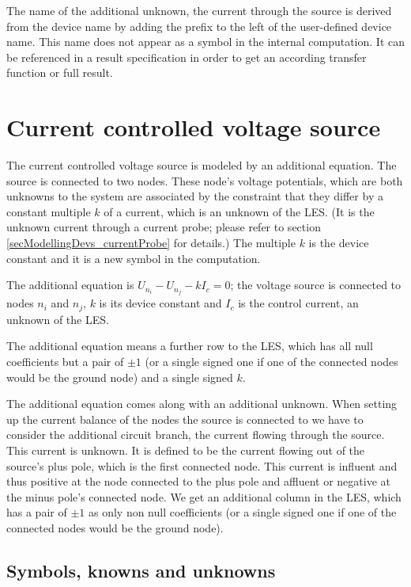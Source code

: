 The name of the additional unknown, the current through the source is
derived from the device name by adding the prefix  to the left
of the user-defined device name. This name does not appear as a symbol in
the internal computation. It can be referenced in a result specification
in order to get an according transfer function or full result.


\section{Current controlled voltage source}

The current controlled voltage source is modeled by an additional
equation. The source is connected to two nodes. These node's voltage
potentials, which are both unknowns to the system are associated by the
constraint that they differ by a constant multiple $k$ of a current, which
is an unknown of the LES. (It is the unknown current through a current
probe; please refer to section \ref{secModellingDevs_currentProbe} for
details.) The multiple $k$ is the device constant and it is a new symbol
in the computation.

The additional equation is $U_{n_i} - U_{n_j} - k I_c = 0$;
the voltage source is connected to nodes $n_i$ and $n_j$, $k$ is its
device constant and $I_c$ is the control current, an unknown of the LES.

The additional equation means a further row to the LES, which has all null
coefficients but a pair of $\pm 1$ (or a single signed one if one of the
connected nodes would be the ground node) and a single signed $k$.

The additional equation comes along with an additional unknown. When
setting up the current balance of the nodes the source is connected to we
have to consider the additional circuit branch, the current flowing
through the source. This current is unknown. It is defined to be the
current flowing out of the source's plus pole, which is the first
connected node. This current is influent and thus positive at the node
connected to the plus pole and affluent or negative at the minus pole's
connected node. We get an additional column in the LES, which has a pair
of $\pm 1$ as only non null coefficients (or a single signed one if one of
the connected nodes would be the ground node).


\subsection{Symbols, knowns and unknowns}


